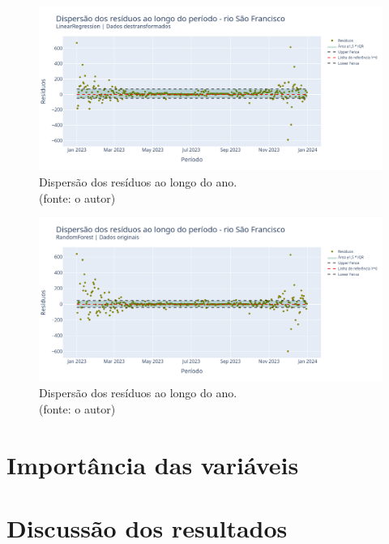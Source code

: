 \begin{figure}[!h]
	\centering
	\includegraphics[scale=0.33]{Figuras/rio_sao_francisco/wfv/LR/LR_WFV_LOG_RESID_x_TEMPO.png}
	\caption{Dispersão dos resíduos ao longo do ano.\\(fonte: o autor)}
	\label{fig:francisco_LR_WFV_LOG_RESID_x_TEMPO}
\end{figure}

\begin{figure}[!h]
	\centering
	\includegraphics[scale=0.33]{Figuras/rio_sao_francisco/wfv/RF/RF_WFV_ORIG_RESID_x_TEMPO.png}
	\caption{Dispersão dos resíduos ao longo do ano.\\(fonte: o autor)}
	\label{fig:francisco_RF_WFV_ORIG_RESID_x_TEMPO}
\end{figure}
\clearpage


\section{Importância das variáveis}

\section{Discuss\~ao dos resultados}
